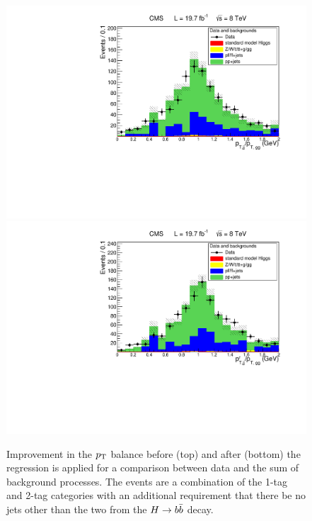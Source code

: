\begin{figure}[ht]
\begin{center}
\includegraphics[width=.7\textwidth]{figures/objects/pt_balance_datavsmc_before.pdf}
\includegraphics[width=.7\textwidth]{figures/objects/pt_balance_datavsmc_after.pdf}
\end{center}
\caption{Improvement in the $p_{\rm T}$ balance before (top) and after (bottom) the regression is
applied for a comparison between data and the sum of background processes. The events are a combination
of the 1-tag and 2-tag categories with an additional requirement that there be no jets other than
the two from the $H\to b\bar{b}$ decay.}
\label{fig:regression_validation_datavsmc} 
\end{figure}
